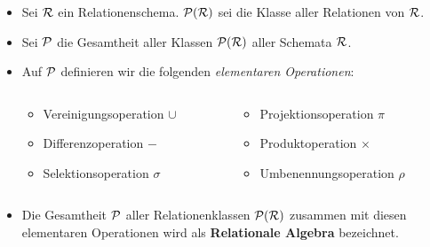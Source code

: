 \begin{frame}\frametitle{\insertsection}
\framesubtitle{\insertsubsection}
\onslide
\begin{itemize}
	\item Sei $\mathcal{R}$ ein Relationenschema. $\mathcal{P}(\mathcal{R})$ sei die Klasse aller Relationen von $\mathcal{R}$.\\[4pt]
  \pause 
	\item Sei $\mathcal{P}$ die Gesamtheit aller Klassen $\mathcal{P}(\mathcal{R})$ aller Schemata $\mathcal{R}$.\\[4pt]
	\pause
	\item Auf $\mathcal{P}$ definieren wir die folgenden \emph{elementaren Operationen}:\\[-4pt]
	\begin{columns}
		\begin{column}{.4\textwidth}
			\begin{itemize}
				\item Vereinigungsoperation $\cup$
				\item Differenzoperation $-$
				\item Selektionsoperation $\sigma$
			\end{itemize}
		\end{column}
		
		\begin{column}{.4\textwidth}
			\begin{itemize}
				\item Projektionsoperation $\pi$
				\item Produktoperation $\times$
				\item Umbenennungsoperation $\rho$
			\end{itemize}
		\end{column}
	\end{columns}
	\abs
	\pause
	\item Die Gesamtheit $\mathcal{P}$ aller Relationenklassen $\mathcal{P}(\mathcal{R})$ zusammen mit diesen elementaren Operationen wird als 
	\textbf{Relationale Algebra} bezeichnet.
\end{itemize}
\end{frame}

